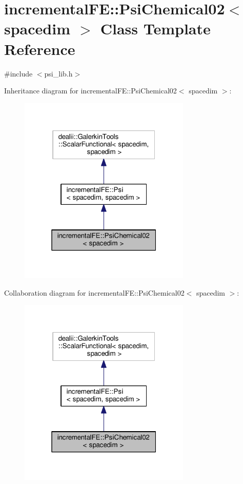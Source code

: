 \hypertarget{classincremental_f_e_1_1_psi_chemical02}{}\section{incremental\+FE\+:\+:Psi\+Chemical02$<$ spacedim $>$ Class Template Reference}
\label{classincremental_f_e_1_1_psi_chemical02}


{\ttfamily \#include $<$psi\+\_\+lib.\+h$>$}



Inheritance diagram for incremental\+FE\+:\+:Psi\+Chemical02$<$ spacedim $>$\+:\nopagebreak
\begin{figure}[H]
\begin{center}
\leavevmode
\includegraphics[width=232pt]{classincremental_f_e_1_1_psi_chemical02__inherit__graph}
\end{center}
\end{figure}


Collaboration diagram for incremental\+FE\+:\+:Psi\+Chemical02$<$ spacedim $>$\+:\nopagebreak
\begin{figure}[H]
\begin{center}
\leavevmode
\includegraphics[width=232pt]{classincremental_f_e_1_1_psi_chemical02__coll__graph}
\end{center}
\end{figure}
